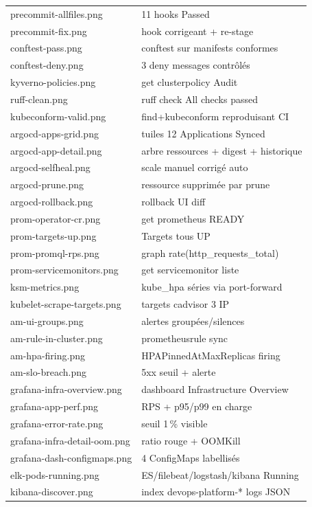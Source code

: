 \documentclass[12pt,a4paper]{article}
\begin{document}
{\begin{longtable}{@{}p{5.6cm}p{9.4cm}@{}}
precommit-allfiles.png & 11 hooks Passed \\
precommit-fix.png & hook corrigeant + re-stage \\
conftest-pass.png & conftest sur manifests conformes \\
conftest-deny.png & 3 deny messages contrôlés \\
kyverno-policies.png & get clusterpolicy Audit \\
ruff-clean.png & ruff check All checks passed \\
kubeconform-valid.png & find+kubeconform reproduisant CI \\
argocd-apps-grid.png & tuiles 12 Applications Synced \\
argocd-app-detail.png & arbre ressources + digest + historique \\
argocd-selfheal.png & scale manuel corrigé auto \\
argocd-prune.png & ressource supprimée par prune \\
argocd-rollback.png & rollback UI diff \\
prom-operator-cr.png & get prometheus READY \\
prom-targets-up.png & Targets tous UP \\
prom-promql-rps.png & graph rate(http\_requests\_total) \\
prom-servicemonitors.png & get servicemonitor liste \\
ksm-metrics.png & kube\_hpa séries via port-forward \\
kubelet-scrape-targets.png & targets cadvisor 3 IP \\
am-ui-groups.png & alertes groupées/silences \\
am-rule-in-cluster.png & prometheusrule sync \\
am-hpa-firing.png & HPAPinnedAtMaxReplicas firing \\
am-slo-breach.png & 5xx seuil + alerte \\
grafana-infra-overview.png & dashboard Infrastructure Overview \\
grafana-app-perf.png & RPS + p95/p99 en charge \\
grafana-error-rate.png & seuil 1\,\% visible \\
grafana-infra-detail-oom.png & ratio rouge + OOMKill \\
grafana-dash-configmaps.png & 4 ConfigMaps labellisés \\
elk-pods-running.png & ES/filebeat/logstash/kibana Running \\
kibana-discover.png & index devops-platform-* logs JSON \\

\end{longtable}}
\end{document}
